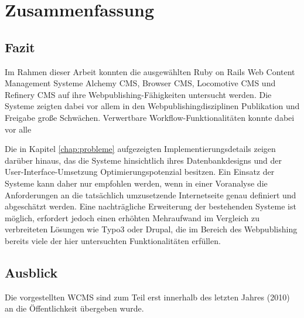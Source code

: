 \chapter{Zusammenfassung}

\section{Fazit}

Im Rahmen dieser Arbeit konnten die ausgewählten Ruby on Rails Web Content Management Systeme Alchemy CMS, Browser CMS, Locomotive CMS und Refinery CMS auf ihre Webpublishing-Fähigkeiten untersucht werden. Die Systeme zeigten dabei vor allem in den Webpublishingdisziplinen Publikation und Freigabe große Schwächen. Verwertbare Workflow-Funktionalitäten konnte dabei vor alle

Die in Kapitel \ref{chap:probleme} aufgezeigten Implementierungsdetails zeigen darüber hinaus, das die Systeme hinsichtlich ihres Datenbankdesigns und der User-Interface-Umsetzung Optimierungspotenzial besitzen.
Ein Einsatz der Systeme kann daher nur empfohlen werden, wenn in einer Voranalyse die Anforderungen an die tatsächlich umzusetzende Internetseite genau definiert und abgeschätzt werden. Eine nachträgliche Erweiterung der bestehenden Systeme ist möglich, erfordert jedoch einen erhöhten Mehraufwand im Vergleich zu verbreiteten Lösungen wie Typo3 oder Drupal, die im Bereich des Webpublishing bereits viele der hier untersuchten Funktionalitäten erfüllen.



\section{Ausblick}
Die vorgestellten WCMS sind zum Teil erst innerhalb des letzten Jahres (2010) an die Öffentlichkeit übergeben wurde.
